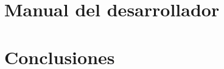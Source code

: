 \documentclass[a4paper,11pt,twoside]{book}
\begin{document}
\chapter{Manual del desarrollador}


\chapter{Conclusiones}


\chapter*{\bibname}

%

\begingroup
  \def\chapter*#1{}
\renewcommand{\bibname}{}



\backmatter


\end{document}
